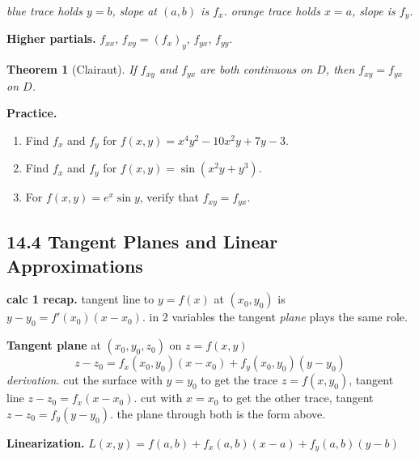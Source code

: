 \documentclass[12pt]{article}
\theoremstyle{compact}
\newtheorem{thm}{Theorem}[section]
\begin{document}
\textit{blue trace holds $y=b$, slope at $(a,b)$ is $f_x$. orange trace holds $x=a$, slope is $f_y$.}

\textbf{Higher partials.} $f_{xx}$, $f_{xy}=(f_x)_y$, $f_{yx}$, $f_{yy}$.

\begin{thm}[Clairaut]
If $f_{xy}$ and $f_{yx}$ are both continuous on $D$, then $f_{xy}=f_{yx}$ on $D$.
\end{thm}

\medskip\textbf{Practice.}
\begin{enumerate}[noitemsep]
  \item Find $f_x$ and $f_y$ for $f(x,y)=x^4y^2-10x^2y+7y-3$.
  \item Find $f_x$ and $f_y$ for $f(x,y)=\sin(x^2y+y^3)$.
  \item For $f(x,y)=e^x\sin y$, verify that $f_{xy}=f_{yx}$.
\end{enumerate}

\subsection{14.4 Tangent Planes and Linear Approximations}

\medskip\textbf{calc 1 recap.} tangent line to $y=f(x)$ at $(x_0,y_0)$ is $y-y_0=f'(x_0)(x-x_0)$. in 2 variables the tangent \emph{plane} plays the same role.

\textbf{Tangent plane} at $(x_0,y_0,z_0)$ on $z=f(x,y)$
\[
z - z_0 = f_x(x_0,y_0)(x-x_0)+f_y(x_0,y_0)(y-y_0)
\]
\textit{derivation.} cut the surface with $y=y_0$ to get the trace $z=f(x,y_0)$, tangent line $z-z_0=f_x(x-x_0)$. cut with $x=x_0$ to get the other trace, tangent $z-z_0=f_y(y-y_0)$. the plane through both is the form above.

\textbf{Linearization.} $L(x,y) = f(a,b)+f_x(a,b)(x-a)+f_y(a,b)(y-b)$
\end{document}

